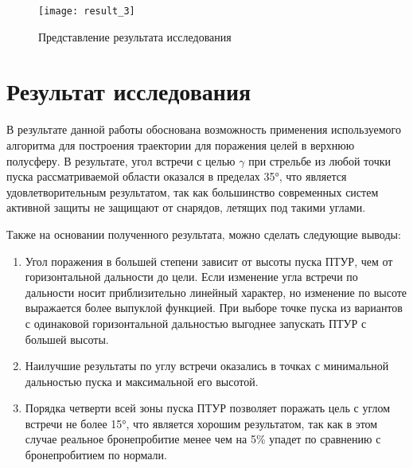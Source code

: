 \begin{figure}[!h]
\begin{center}
	\texttt{[image: result\_3]}
	\caption{Представление результата исследования}
	\label{fig:result_3}
\end{center}
\end{figure}

\clearpage
\section{Результат исследования}
В результате данной работы обоснована возможность применения используемого алгоритма для построения траектории для поражения целей в верхнюю полусферу. В результате, угол встречи с целью $\gamma$ при стрельбе из любой точки пуска рассматриваемой области оказался в пределах 35°, что является удовлетворительным результатом, так как большинство современных систем активной защиты не защищают от снарядов, летящих под такими углами.

Также на основании полученного результата, можно сделать следующие выводы:
\begin{enumerate}[1.]
 	\item Угол поражения в большей степени зависит от высоты пуска ПТУР, чем от горизонтальной дальности до цели. Если изменение угла встречи по дальности носит приблизительно линейный характер, но изменение по высоте выражается более выпуклой функцией. При выборе точке пуска из вариантов с одинаковой горизонтальной дальностью выгоднее запускать ПТУР с большей высоты.
 	\item Наилучшие результаты по углу встречи оказались в точках с минимальной дальностью пуска и максимальной его высотой.
 	\item Порядка четверти всей зоны пуска ПТУР позволяет поражать цель с углом встречи не более 15°, что является хорошим результатом, так как в этом случае реальное бронепробитие менее чем на 5\% упадет по сравнению с бронепробитием по нормали.
\end{enumerate}
